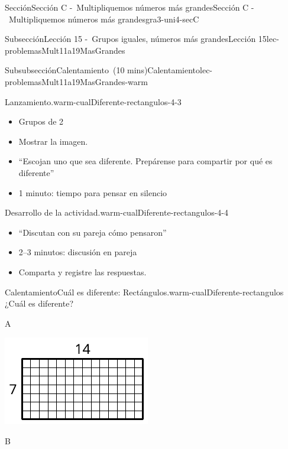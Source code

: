 \documentclass[oneside,10pt,]{article}
\begin{document}
\begin{sectionptx}{Sección}{Sección C -~Multipliquemos números más grandes}{}{Sección C -~Multipliquemos números más grandes}{}{}{gra3-uni4-secC}
\begin{subsectionptx}{Subsección}{Lección 15 -~Grupos iguales, números más grandes}{}{Lección 15}{}{}{lec-problemasMult11a19MasGrandes}
\begin{subsubsectionptx}{Subsubsección}{Calentamiento~(10 mins)}{}{Calentamiento}{}{}{lec-problemasMult11a19MasGrandes-warm}
\begin{paragraphs}{Lanzamiento.}{warm-cualDiferente-rectangulos-4-3}%
%
\begin{itemize}[label=\textbullet]
\item{}Grupos de 2%
\item{}Mostrar la imagen.%
\item{}``Escojan uno que sea diferente. Prepárense para compartir por qué es diferente''%
\item{}1 minuto: tiempo para pensar en silencio%
\end{itemize}
\end{paragraphs}%
\begin{paragraphs}{Desarrollo de la actividad.}{warm-cualDiferente-rectangulos-4-4}%
%
\begin{itemize}[label=\textbullet]
\item{}``Discutan con su pareja cómo pensaron''%
\item{}2–3 minutos: discusión en pareja%
\item{}Comparta y registre las respuestas.%
\end{itemize}
\end{paragraphs}%
\begin{exploration}{Calentamiento}{Cuál es diferente: Rectángulos.}{warm-cualDiferente-rectangulos}%
¿Cuál es diferente?%
\begin{sidebyside}{2}{0}{0}{0}%
\begin{sbspanel}{0.5}%
A%
\par
\includegraphics[width=\linewidth]{external/svg-source/tikz-file-149350-scale13.pdf}
\end{sbspanel}%
\begin{sbspanel}{0.5}%
B%
\par

\end{sbspanel}
\end{sidebyside}
\end{exploration}
\end{subsubsectionptx}
\end{subsectionptx}
\end{sectionptx}
\end{document}
